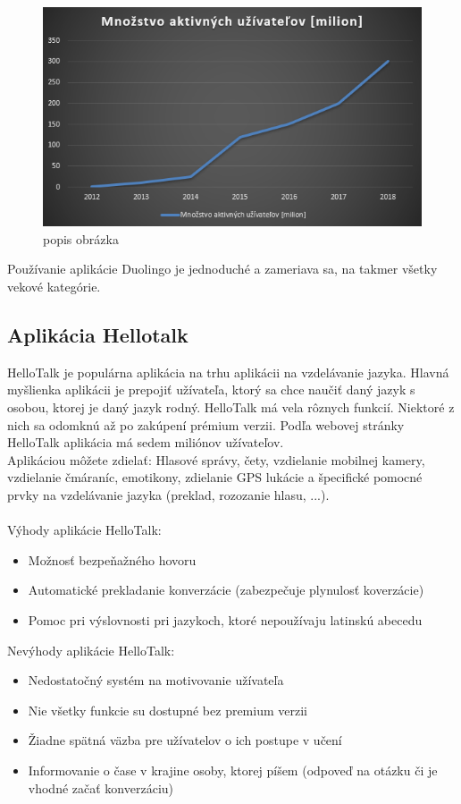\documentclass[10pt,oneside,slovak,a4paper]{article}
\begin{document}
\begin{figure} %
\centering
\includegraphics[width=\textwidth]{duolingo.png}
\caption{popis obrázka}
\label{duo-uzivatelia}
\end{figure}

Používanie aplikácie Duolingo je jednoduché a zameriava sa, na takmer všetky vekové kategórie\cite{duolingo}.
\subsection{Aplikácia Hellotalk} %
HelloTalk je populárna aplikácia na trhu aplikácii na vzdelávanie jazyka. Hlavná myšlienka aplikácii je prepojiť užívateľa, ktorý sa chce naučiť daný jazyk s osobou, ktorej je daný jazyk rodný. HelloTalk má vela rôznych funkcií. Niektoré z nich sa odomknú až po zakúpení prémium verzii. Podľa webovej stránky HelloTalk aplikácia má sedem miliónov užívateľov.\cite{hellotalk}\\
Aplikáciou môžete zdielať: Hlasové správy, čety,  vzdielanie mobilnej kamery, vzdielanie čmáraníc, emotikony, zdielanie GPS lukácie a špecifické pomocné prvky na vzdelávanie jazyka (preklad, rozozanie hlasu, ...)\cite{hellotalk}.\\
\\
Výhody aplikácie HelloTalk:\cite{hellotalk}
\begin{itemize}
\item Možnosť bezpeňažného hovoru
\item Automatické prekladanie konverzácie (zabezpečuje plynulosť koverzácie)
\item Pomoc pri výslovnosti pri jazykoch, ktoré nepoužívaju latinskú abecedu
\end{itemize}
Nevýhody aplikácie HelloTalk:\cite{hellotalk}
\begin{itemize}
\item Nedostatočný systém na motivovanie užívateľa
\item Nie všetky funkcie su dostupné bez premium verzii
\item Žiadne spätná väzba pre užívatelov o ich postupe v učení 
\item Informovanie o čase v krajine osoby, ktorej píšem (odpoveď na otázku či je vhodné začať konverzáciu)
\end{itemize}
\end{document}
